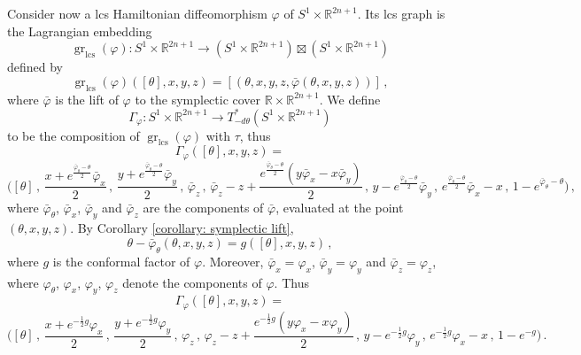 \documentclass{amsart}
\DeclareMathOperator{\gr}{gr}
\DeclareMathOperator{\lcs}{lcs}
\theoremstyle{remark}
\begin{document}
Consider now a lcs Hamiltonian diffeomorphism $\varphi$
of $S^1 \times \mathbb{R}^{2n+1}$.
Its lcs graph is the Lagrangian embedding
\[
\gr_{\lcs} (\varphi): S^1 \times \mathbb{R}^{2n+1} \rightarrow
(S^1 \times \mathbb{R}^{2n+1}) \boxtimes (S^1 \times \mathbb{R}^{2n+1})
\]
defined by
\[
\gr_{\lcs} (\varphi) ([\theta], x, y, z)
= [(\theta, x, y, z, \bar{\varphi} (\theta, x, y, z))] \,,
\]
where $\bar{\varphi}$ is the lift of $\varphi$
to the symplectic cover $\mathbb{R} \times \mathbb{R}^{2n+1}$.
We define
\begin{equation*}
\Gamma_{\varphi}: S^1 \times \mathbb{R}^{2n+1} \rightarrow
T^{\ast}_{-d\theta} (S^1 \times \mathbb{R}^{2n+1})
\end{equation*}
to be the composition of $\gr_{\lcs}(\varphi)$ with $\tau$,
thus
$$
\Gamma_{\varphi} ([\theta], x, y, z) =
$$
\begin{equation*}
\Big( [\theta] \,,\, \frac{ x + e^{\frac{\bar{\varphi}_{\theta} - \theta}{2}} \bar{\varphi}_x}{2} \,,\,
\frac{ y + e^{\frac{\bar{\varphi}_{\theta} - \theta}{2}} \bar{\varphi}_y}{2}
\,,\, \bar{\varphi}_{z} \,,\, \bar{\varphi}_{z} - z
+ \frac{e^{\frac{ \bar{\varphi}_{\theta} - \theta}{2}}
(y\bar{\varphi}_x - x\bar{\varphi}_y)}{2} \,,\,
y - e^{\frac{\bar{\varphi}_{\theta} - \theta}{2}} \bar{\varphi}_y \,,\,
e^{\frac{\bar{\varphi}_{\theta} - \theta}{2}} \bar{\varphi}_x - x \,,\,
1 - e^{\bar{\varphi}_{\theta} - \theta} \Big) \,,    
\end{equation*}
where $\bar{\varphi}_{\theta}$, $\bar{\varphi}_x$, $\bar{\varphi}_y$ and $\bar{\varphi}_z$
are the components of $\bar{\varphi}$,
evaluated at the point $(\theta, x, y, z)$.
By Corollary \ref{corollary: symplectic lift},
\begin{equation}\label{equation: corollary symplectic lift Euclidean}
\theta - \bar{\varphi}_{\theta} (\theta, x, y, z)
= g ([\theta], x, y, z) \,,
\end{equation}
where $g$ is the conformal factor of $\varphi$.
Moreover, 
$\bar{\varphi}_x = \varphi_x$, $\bar{\varphi}_y = \varphi_y$
and $\bar{\varphi}_z = \varphi_z$,
where $\varphi_{\theta}$, $\varphi_x$, $\varphi_y$, $\varphi_z$
denote the components of $\varphi$.
Thus
\begin{equation}\label{equation: formula for associated Lagrangian}
\Gamma_{\varphi} ([\theta], x, y, z) =
\end{equation}
\[
\Big( [\theta] \,,\, \frac{ x + e^{-\frac{1}{2}g} \varphi_x}{2} \,,\,
\frac{ y + e^{-\frac{1}{2}g} \varphi_y}{2}
\,,\, \varphi_{z} \,,\, 
\varphi_z - z + \frac{e^{-\frac{1}{2}g} (y\varphi_x - x\varphi_y)}{2} \,,\,
y - e^{-\frac{1}{2}g} \varphi_y \,,\,
e^{-\frac{1}{2}g} \varphi_x - x \,,\,
1 - e^{-g} \Big) \,.
\]
\end{document}
